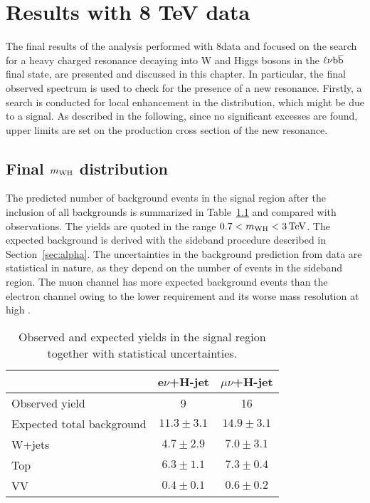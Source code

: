 \chapter{Results with 8 TeV data}
\label{ch:results8}

The final results of the analysis performed with 8\TeV data and focused on the search for a heavy charged resonance decaying into W and Higgs bosons in the $\ell\nu{\mathrm{b}\overline{\mathrm{b}}}$ final state, are presented and discussed in this chapter.
In particular, the final observed \mWH spectrum is used to check for the presence of a new resonance.
Firstly, a search is conducted for local enhancement in the \mWH distribution, which might be due to a signal. 
As described in the following, since no significant excesses are found, upper limits are set on the production cross section of the new resonance.

\section{Final $m_{\rm WH}$ distribution}\label{sec:mWH8TeV}

The predicted number of background events in the signal region after the inclusion of all backgrounds is summarized in Table~\ref{tab:WHExpectedYields} and compared with observations.
The yields are quoted in the range $0.7 < m_{\rm WH} < 3\,\text{Te\hspace{-.08em}V}$. The expected background is derived with the sideband procedure described in Section~\ref{sec:alpha}.
The uncertainties in the background prediction from data are statistical in nature, as they depend on the number of events in the sideband region.
The muon channel has more expected background events than the electron channel owing to the lower \ETmiss requirement and its worse mass resolution at high \pt.

\begin{table}[!htb]
\centering
\caption{
Observed and expected yields in the signal region together with statistical uncertainties.
}
\label{tab:WHExpectedYields}
\begin{tabular}{lcc}
   & e$\nu$+H-jet & {$\mu\nu$+H-jet}   \\
\hline \hline
 Observed yield     & 9   & 16  \\
 Expected total background   & $11.3 \pm 3.1$  & $14.9 \pm 3.1$   \\
\hline
 W+jets   & $4.7 \pm 2.9$  & $7.0 \pm 3.1$   \\
 Top  & $6.3 \pm 1.1$ & $7.3 \pm 0.4$ \\
 VV   & $0.4 \pm 0.1$  & $0.6 \pm 0.2$   \\
\hline \hline
\end{tabular}
\end{table}

